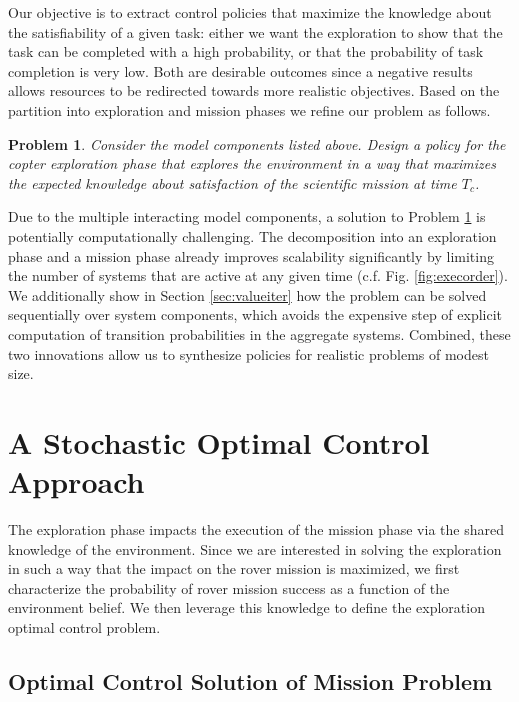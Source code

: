 \documentclass[conference]{IEEEtran}
\newtheorem{problem}{Problem}
\begin{document}
\smallskip
{} Our objective is to extract control policies that maximize the knowledge about the satisfiability of a given task: either we want the exploration to show that the task can be completed with a high probability, or that the probability of task completion is very low. Both are desirable outcomes since a negative results allows resources to be redirected towards more realistic objectives. Based on the partition into exploration and mission phases we refine our problem as follows.
\begin{problem}
\label{prob:main}
  Consider the model components listed above. Design a policy for the copter exploration phase that explores the environment in a way that maximizes the expected knowledge about satisfaction of the scientific mission at time $T_c$.
\end{problem}

\smallskip
{} Due to the multiple interacting model components, a solution to Problem \ref{prob:main} is potentially computationally challenging. The decomposition into an exploration phase and a mission phase already improves scalability significantly by limiting the number of systems that are active at any given time (c.f. Fig. \ref{fig:execorder}). We additionally show in Section \ref{sec:valueiter} how the problem can be solved sequentially over system components, which avoids the expensive step of explicit computation of transition probabilities in the aggregate systems. Combined, these two innovations allow us to synthesize policies for realistic problems of modest size.


\section{A Stochastic Optimal Control Approach}
\label{sec:stochopt}

The exploration phase impacts the execution of the mission phase via the shared knowledge of the environment. Since we are interested in solving the exploration in such a way that the impact on the rover mission is maximized, we first characterize the probability of rover mission success as a function of the environment belief. We then leverage this knowledge to define the exploration optimal control problem.

\subsection{Optimal Control Solution of Mission Problem}
\end{document}
